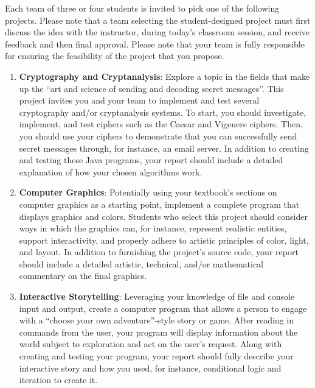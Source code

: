 \documentclass[11pt]{article}
\begin{document}
Each team of three or four students is invited to pick one of the following
projects.  Please note that a team selecting the student-designed project must
first discuss the idea with the instructor, during today's classroom session,
and receive feedback and then final approval. Please note that your team is
fully responsible for ensuring the feasibility of the project that you propose.

\begin{enumerate}

  \item {\bf Cryptography and Cryptanalysis}: Explore a topic in the fields that
    make up the ``art and science of sending and decoding secret messages''.
    This project invites you and your team to implement and test several
    cryptography and/or cryptanalysis systems. To start, you should investigate,
    implement, and test ciphers such as the Caesar and Vigenere ciphers. Then,
    you should use your ciphers to demonstrate that you can successfully send
    secret messages through, for instance, an email server. In addition to
    creating and testing these Java programs, your report should include a
    detailed explanation of how your chosen algorithms work.

  \item {\bf Computer Graphics}: Potentially using your textbook's sections on
    computer graphics as a starting point, implement a complete program that
    displays graphics and colors. Students who select this project should
    consider ways in which the graphics can, for instance, represent realistic
    entities, support interactivity, and properly adhere to artistic principles
    of color, light, and layout. In addition to furnishing the project's source
    code, your report should include a detailed artistic, technical, and/or
    mathematical commentary on the final graphics.

  \item {\bf Interactive Storytelling}: Leveraging your knowledge of file and
    console input and output, create a computer program that allows a person to
    engage with a ``choose your own adventure''-style story or game. After
    reading in commands from the user, your program will display information
    about the world subject to exploration and act on the user's request. Along
    with creating and testing your program, your report should fully describe
    your interactive story and how you used, for instance, conditional logic and
    iteration to create it.


\end{enumerate}
\end{document}
